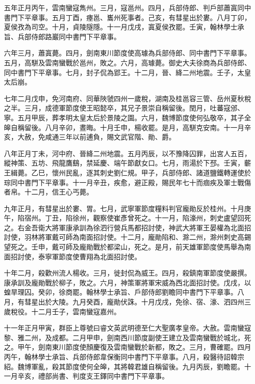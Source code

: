 \begin{pinyinscope}
 五年正月丙午，雲南蠻寇雋州。三月，寇邕州。四月，兵部侍郎、判戶部蕭寘同中書門下平章事。五月丁酉，瘞邕、巂州死事者。己亥，有彗星出於婁。八月丁卯，夏侯孜為司空。十月，貞陵隧隱。十一月戊戌，寘夏侯孜罷。壬寅，翰林學士承旨、兵部侍郎路巖同中書門下平章事。



 六年三月，蕭寘薨。四月，劍南東川節度使高璩為兵部侍郎、同中書門下平章事。五月，高駢及雲南蠻戰於邕州，敗之。六月，高璩薨。御史大夫徐商為兵部侍郎、同中書門下平章事。七月，封子侃為郢王。十二月，晉、絳二州地震。壬子，太皇太后崩。



 七年二月戊申，免河南府、同華陜虢四州一歲稅，湖南及桂邕容三管、岳州夏秋稅之半。三月，成德軍節度使王昭懿卒，其兄子景崇自稱留後。閏月，吐蕃寇邠、寧。五月甲辰，葬孝明太皇太后於景陵之園。六月，魏博節度使何弘敬卒，其子全皞自稱留後。八月辛卯，晝晦。十月壬申，楊收罷。是月，高駢克安南。十一月辛亥，大赦，免咸通三年以前逋負，賜文武官階、勛、爵。



 八年正月丁未，河中府、晉絳二州地震。五月丙辰，以不豫降囚罪，出宮人五百，縱神策、五坊、飛龍鷹鷂，禁延慶、端午節獻女口。七月，雨湯於下邳。壬寅，蘄王緝薨。乙巳，懷州民亂，逐其刺史劉仁規。甲子，兵部侍郎、諸道鹽鐵轉運使於琮同中書門下平章事。十一月辛丑，疾愈，避正殿，賜民年七十而痼疾及軍士戰傷者帛。十二月，信王心丐薨。



 九年正月，有彗星出於婁、胃。七月，武寧軍節度糧料判官龐勛反於桂州。十月庚午，陷宿州。丁丑，陷徐州，觀察使崔彥曾死之。十一月，陷濠州，刺史盧望回死之。右金吾衛大將軍康承訓為徐泗行營兵馬都招討使，神武大將軍王晏權為北面招討使，羽林將軍戴可師為南面招討使。十二月，龐勛陷和、滁二州，滁州刺史高錫望死之。壬申，戴可師及龐勛戰於都梁山，死之。是月，前天雄軍節度使馬舉為南面招討使，泰寧軍節度使曹翔為北面招討使。



 十年二月，殺歡州流人楊收。三月，徙封侃為威王。四月，殺鎮南軍節度使嚴撰。康承訓及龐勛戰於柳子，敗之。六月，神策軍將軍宋威為西北面招討使。戊戌，以蝗旱理囚。癸卯，徐商罷。翰林學士承旨、戶部侍郎劉瞻同中書門下平章事。八月，有彗星出於大陵。九月癸酉，龐勛伏誅。十月戊戌，免徐、宿、濠、泗四州三歲稅役。十二月壬子，雲南蠻寇嘉州。



 十一年正月甲寅，群臣上尊號曰睿文英武明德至仁大聖廣孝皇帝。大赦。雲南蠻寇黎、雅二州，及成都。二月甲申，劍南西川節度副使王建立及雲南蠻戰於城北，死之。甲午，劍南東川節度使顏慶復及雲南蠻戰於新都，敗之。三月，曹確罷。四月丙午，翰林學士承旨、兵部侍郎韋保衡同中書門下平章事。八月，殺醫待詔韓宗紹。魏博軍亂，殺其節度使何全皞，其將韓君雄自稱留後。九月丙辰，劉瞻罷。十一月辛亥，禮部尚書、判度支王鐸同中書門下平章事。




\end{pinyinscope}
